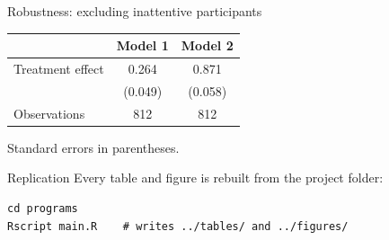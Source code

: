 \documentclass[
    aspectratio=169,11pt,t,
]{beamer}
\begin{document}
\renewcommand{\appendixname}{Appendix}
\appendix
{}

\begin{frame}[label=robustness]{Robustness: excluding inattentive participants}
  \centering
  \begin{tabular}{lcc}
    \toprule
                     & Model 1 & Model 2 \\
    \midrule
    Treatment effect & 0.264   & 0.871   \\
                     & (0.049) & (0.058) \\
    \midrule
    Observations     & 812     & 812     \\
    \bottomrule
  \end{tabular}

  \medskip
  {\footnotesize Standard errors in parentheses.}

  \vfill
  \hfill\hyperlink{results}{}
\end{frame}

\begin{frame}[fragile]{Replication}
  Every table and figure is rebuilt from the project folder:
\begin{verbatim}
cd programs
Rscript main.R    # writes ../tables/ and ../figures/
\end{verbatim}
\end{frame}
\end{document}
